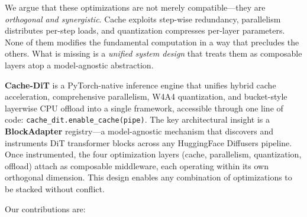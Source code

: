 \documentclass[10pt]{article}
\begin{document}
We argue that these optimizations are not merely compatible---they are \textit{orthogonal and synergistic}. Cache exploits step-wise redundancy, parallelism distributes per-step loads, and quantization compresses per-layer parameters. None of them modifies the fundamental computation in a way that precludes the others. What is missing is a \textit{unified system design} that treats them as composable layers atop a model-agnostic abstraction.

\textbf{Cache-DiT} is a PyTorch-native inference engine that unifies hybrid cache acceleration, comprehensive parallelism, W4A4 quantization, and bucket-style layerwise CPU offload into a single framework, accessible through one line of code: \texttt{cache\_dit.enable\_cache(pipe)}. The key architectural insight is a \textbf{BlockAdapter} registry---a model-agnostic mechanism that discovers and instruments DiT transformer blocks across any HuggingFace Diffusers pipeline. Once instrumented, the four optimization layers (cache, parallelism, quantization, offload) attach as composable middleware, each operating within its own orthogonal dimension. This design enables any combination of optimizations to be stacked without conflict.

Our contributions are:
\end{document}
